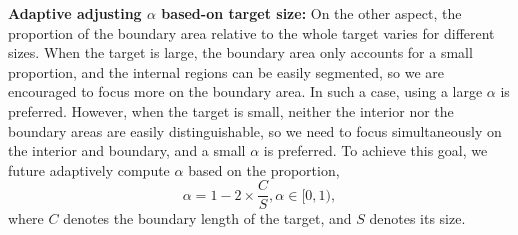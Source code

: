\documentclass[runningheads]{llncs}
\begin{document}
\textbf{Adaptive adjusting $\alpha$ based-on target size:}
On the other aspect, the proportion of the boundary area relative to the whole target varies for different sizes. When the target is large, the boundary area only accounts for a small proportion, and the internal regions can be easily segmented, so we are encouraged to focus more on the boundary area. In such a case, using a large $\alpha$ is preferred. However, when the target is small, neither the interior nor the boundary areas are easily distinguishable, so we need to focus simultaneously on the interior and boundary, and a small $\alpha$ is preferred. To achieve this goal, we future adaptively compute $\alpha$ based on the proportion,
\begin{equation}
	\alpha = 1 - 2\times\frac{C}{S}, \alpha\in [0, 1),
\end{equation}
where $C$ denotes the boundary length of the target, and $S$ denotes its size. 

\end{document}
